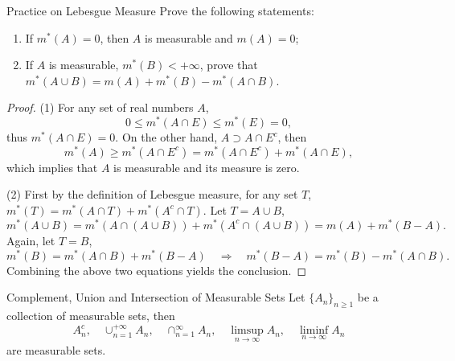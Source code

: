 \begin{example}{Practice on Lebesgue Measure}{}
  Prove the following statements:
  \begin{enumerate}
  \item If $m^{\ast}(A) = 0$, then $A$ is measurable and $m(A) = 0$;
  \item If $A$ is measurable, $m^{\ast}(B) < +\infty$, prove that
    $m^{\ast}(A \cup B) = m(A) + m^{\ast}(B) - m^{\ast}(A \cap B)$.
  \end{enumerate}
\end{example}

\begin{proof}
  (1) For any set of real numbers $A$,
  \begin{equation}
    0 \leq m^{\ast}(A \cap E) \leq m^{\ast}(E) = 0,
  \end{equation}
  thus $m^{\ast}(A \cap E) = 0$. On the other hand, $A \supset A \cap E^c$,
  then
  \begin{equation}
    m^{\ast}(A) \geq m^{\ast}(A \cap E^c) = m^{\ast}(A \cap E^c) + m^{\ast}(A \cap E),
  \end{equation}
  which implies that $A$ is measurable and its measure is zero.

  (2) First by the definition of Lebesgue measure, for any set $T$,
  $m^{\ast}(T) = m^{\ast}(A \cap T) + m^{\ast}(A^c \cap T)$.
  Let $T = A \cup B$,
  \begin{equation}
    m^{\ast}(A \cup B) = m^{\ast}(A \cap (A \cup B)) + m^{\ast}(A^c \cap (A \cup B))
    = m(A) + m^{\ast}(B - A).
  \end{equation}
  Again, let $T = B$,
  \begin{equation}
    m^{\ast}(B) = m^{\ast}(A \cap B) + m^{\ast}(B - A) \quad
    \Rightarrow \quad
    m^{\ast}(B - A) = m^{\ast}(B) - m^{\ast}(A \cap B).
  \end{equation}
  Combining the above two equations yields the conclusion.
\end{proof}

\begin{theorem}{Complement, Union and Intersection of Measurable Sets}{}
  Let $\{A_n\}_{n \geq 1}$ be a collection of measurable sets, then
  \begin{equation}
    A_n^c, \quad \cup _{n=1}^{+\infty} A_n, \quad \cap_{n=1}^{\infty} A_n, \quad
    \limsup \limits _{n \rightarrow \infty} A_n, \quad \liminf \limits_{n \rightarrow \infty} A_n
  \end{equation}
  are measurable sets.
\end{theorem}

